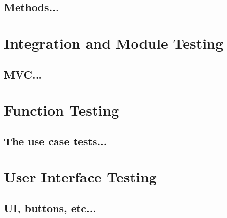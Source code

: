 \documentclass{scrreprt}
\begin{document}
\subsection{Methods...}

\section{Integration and Module Testing}

\subsection{MVC...}

\section{Function Testing}

\subsection{The use case tests...}

\section{User Interface Testing}

\subsection{UI, buttons, etc...}
\end{document}
